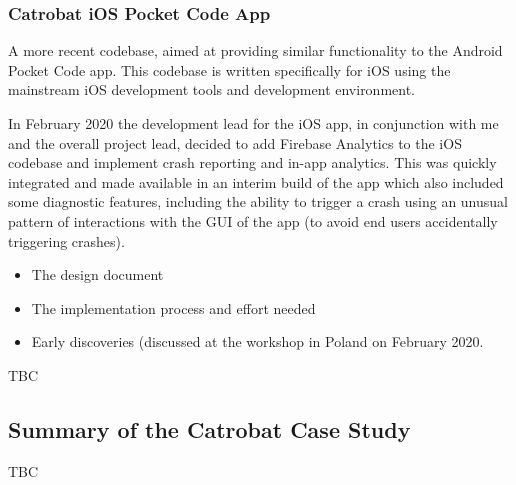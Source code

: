 \subsubsection{Catrobat iOS Pocket Code App}
A more recent codebase, aimed at providing similar functionality to the Android Pocket Code app. This codebase is written specifically for iOS using the mainstream iOS development tools and development environment. 

In February 2020 the development lead for the iOS app, in conjunction with me and the overall project lead, decided to add Firebase Analytics to the iOS codebase and implement crash reporting and in-app analytics. This was quickly integrated and made available in an interim build of the app which also included some diagnostic features, including the ability to trigger a crash using an unusual pattern of interactions with the GUI of the app (to avoid end users accidentally triggering crashes).


\begin{itemize}
    \item The design document
    \item The implementation process and effort needed
    \item Early discoveries (discussed at the workshop in Poland on  February 2020.
\end{itemize}
TBC

\subsection{Summary of the Catrobat Case Study}
TBC
